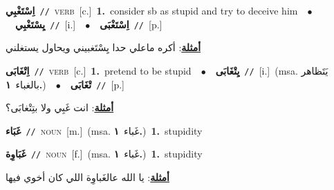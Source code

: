 \documentclass[10pt,a4paper,twoside]{article} %
\begin{document}
\begin{multicols}{2}
{{{\setlength\topsep{0pt}\textbf{\foreignlanguage{arabic}{اِسْتَغْبِي}}\ {\color{gray}\texttt{//}\color{black}}\ \textsc{verb}\ [c.]\ \textbf{1.}~consider sb as stupid and try to deceive him\ \ $\bullet$\ \ \setlength\topsep{0pt}\textbf{\foreignlanguage{arabic}{يِسْتَغْبِي}}\ {\color{gray}\texttt{//}\color{black}}\ [i.]\ \ $\bullet$\ \ \setlength\topsep{0pt}\textbf{\foreignlanguage{arabic}{اِسْتَغْبَى}}\ {\color{gray}\texttt{//}\color{black}}\ [p.]\  \begin{flushright}\color{gray}\foreignlanguage{arabic}{\textbf{\underline{\foreignlanguage{arabic}{أمثلة}}}: أكره ماعلي حدا يِسْتَغبيني ويحاول يستغلني}\end{flushright}\color{black}} \vspace{2mm}

{\setlength\topsep{0pt}\textbf{\foreignlanguage{arabic}{اِتْغَابَى}}\ {\color{gray}\texttt{//}\color{black}}\ \textsc{verb}\ [c.]\ \textbf{1.}~pretend to be stupid\ \ $\bullet$\ \ \setlength\topsep{0pt}\textbf{\foreignlanguage{arabic}{يِتْغَابَى}}\ {\color{gray}\texttt{//}\color{black}}\ [i.]\ \color{gray}(msa. \foreignlanguage{arabic}{يَتَظاهر بالغباء}~\foreignlanguage{arabic}{\textbf{١.}})\color{black}\ \ $\bullet$\ \ \setlength\topsep{0pt}\textbf{\foreignlanguage{arabic}{تْغَابَى}}\ {\color{gray}\texttt{//}\color{black}}\ [p.]\  \begin{flushright}\color{gray}\foreignlanguage{arabic}{\textbf{\underline{\foreignlanguage{arabic}{أمثلة}}}: انت غَبِي ولا بتِتْغابَى؟}\end{flushright}\color{black}} \vspace{2mm}

{\setlength\topsep{0pt}\textbf{\foreignlanguage{arabic}{غَبَاء}}\ {\color{gray}\texttt{//}\color{black}}\ \textsc{noun}\ [m.]\ \color{gray}(msa. \foreignlanguage{arabic}{غَباء}~\foreignlanguage{arabic}{\textbf{١.}})\color{black}\ \textbf{1.}~stupidity\ 

{\setlength\topsep{0pt}\textbf{\foreignlanguage{arabic}{غَبَاوِة}}\ {\color{gray}\texttt{//}\color{black}}\ \textsc{noun}\ [f.]\ \color{gray}(msa. \foreignlanguage{arabic}{غَباء}~\foreignlanguage{arabic}{\textbf{١.}})\color{black}\ \textbf{1.}~stupidity\  \begin{flushright}\color{gray}\foreignlanguage{arabic}{\textbf{\underline{\foreignlanguage{arabic}{أمثلة}}}: يا الله عالغَباوِة اللي كان أخوي فيها}\end{flushright}\color{black}} \vspace{2mm}

}}}
\end{multicols}
\end{document}
